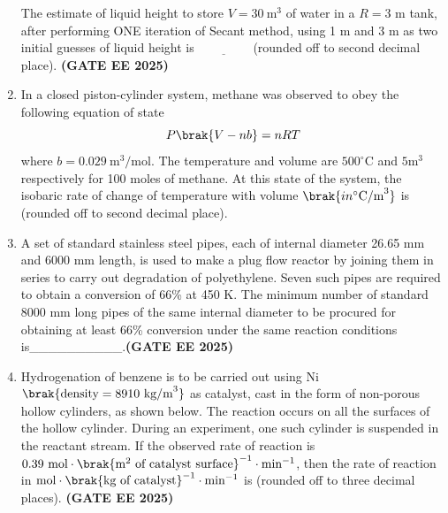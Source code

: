 \documentclass[journal,12pt,onecolumn]{IEEEtran}
\theoremstyle{remark}
\begin{document}
\begin{enumerate}
\begin{figure}
\begin{center}
\end{center}
\end{figure}
The estimate of liquid height  to store $V=30~\text{m}^{3}$ of water in a $R=3$ m tank, after performing ONE iteration of Secant method, using 1 m and 3 m as two initial guesses of liquid height is$\underline{\hspace{2cm}}$(rounded off to second decimal place). \hfill \textbf{(GATE EE 2025)} 



\item In a closed piston-cylinder system, methane was observed to obey the following equation of state
\[ P\brak{V-nb}=nRT \]
where $b=0.029~\text{m}^{3}/\text{mol}$. The temperature and volume are $500^{\circ}\text{C}$ and $5\text{m}^{3}$ respectively for 100 moles of methane. At this state of the system, the isobaric rate of change of temperature with volume $\brak{in ^{\circ}\text{C/m}^{3}}$ is\underline{\hspace{2cm}} (rounded off to second decimal place).



\item A set of standard stainless steel pipes, each of internal diameter 26.65 mm and 6000 mm length, is used to make a plug flow reactor by joining them in series to carry out degradation of polyethylene. Seven such pipes are required to obtain a conversion of 66\% at 450 K. The minimum number of standard 8000 mm long pipes of the same internal diameter to be procured for obtaining at least 66\% conversion under the same reaction conditions is\_\_\_\_\_\_\_\_\_\_.\hfill \textbf{(GATE EE 2025)} 




\item Hydrogenation of benzene is to be carried out using Ni $\brak{\text{density} = 8910~\text{kg/m}^{3}}$ as catalyst, cast in the form of non-porous hollow cylinders, as shown below. The reaction occurs on all the surfaces of the hollow cylinder. During an experiment, one such cylinder is suspended in the reactant stream. If the observed rate of reaction is $0.39~\text{mol}\cdot\brak{\text{m}^2 \text{ of catalyst surface}}^{-1}\cdot\text{min}^{-1}$, then the rate of reaction in $\text{mol}\cdot\brak{\text{kg of catalyst}}^{-1}\cdot\text{min}^{-1}$ is\underline{\hspace{2cm}} (rounded off to three decimal places). \hfill \textbf{(GATE EE 2025)} 
	\begin{figure}


\end{figure}
\end{enumerate}
\end{document}
